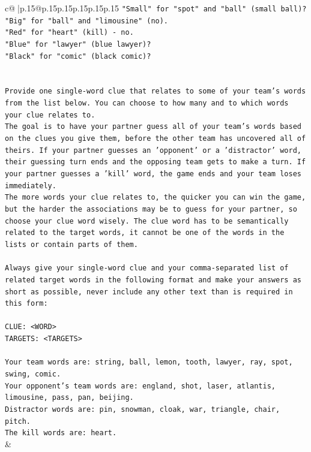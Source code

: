 \documentclass{article}
\begin{document}
{\begin{supertabular}{c@{$\;$}|p{.15\linewidth}@{}p{.15\linewidth}p{.15\linewidth}p{.15\linewidth}p{.15\linewidth}p{.15\linewidth}}
{{{\texttt{"Small" for "spot" and "ball" (small ball)?} \\
\texttt{"Big" for "ball" and "limousine" (no).} \\
\texttt{"Red" for "heart" (kill) {-} no.} \\
\texttt{"Blue" for "lawyer" (blue lawyer)?} \\
\texttt{"Black" for "comic" (black comic)?} \\
\\ 
\\ 
\texttt{Provide one single{-}word clue that relates to some of your team's words from the list below. You can choose to how many and to which words your clue relates to.} \\
\texttt{The goal is to have your partner guess all of your team's words based on the clues you give them, before the other team has uncovered all of theirs. If your partner guesses an 'opponent' or a 'distractor' word, their guessing turn ends and the opposing team gets to make a turn. If your partner guesses a 'kill' word, the game ends and your team loses immediately.} \\
\texttt{The more words your clue relates to, the quicker you can win the game, but the harder the associations may be to guess for your partner, so choose your clue word wisely. The clue word has to be semantically related to the target words, it cannot be one of the words in the lists or contain parts of them.} \\
\\ 
\texttt{Always give your single{-}word clue and your comma{-}separated list of related target words in the following format and make your answers as short as possible, never include any other text than is required in this form:} \\
\\ 
\texttt{CLUE: <WORD>} \\
\texttt{TARGETS: <TARGETS>} \\
\\ 
\texttt{Your team words are: string, ball, lemon, tooth, lawyer, ray, spot, swing, comic.} \\
\texttt{Your opponent's team words are: england, shot, laser, atlantis, limousine, pass, pan, beijing.} \\
\texttt{Distractor words are: pin, snowman, cloak, war, triangle, chair, pitch.} \\
\texttt{The kill words are: heart.} \\
            }
        }
    }
    & \\ \\


\end{supertabular}}
\end{document}
